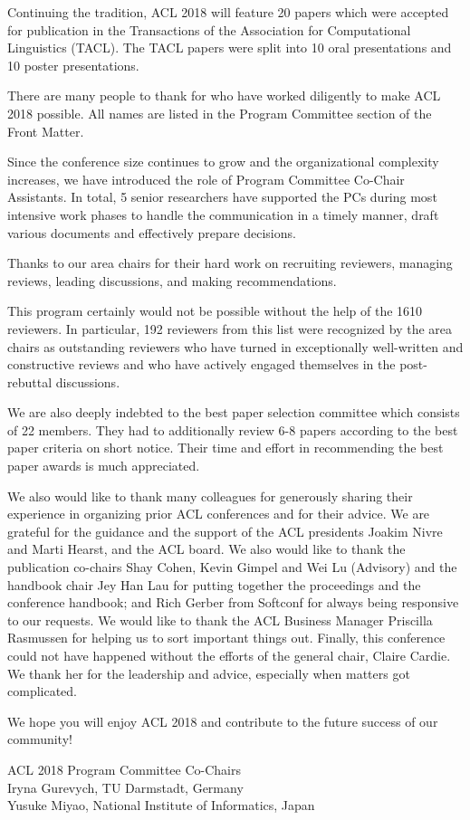 Continuing the tradition, ACL 2018 will feature 20 papers
which were accepted for publication in the Transactions of the
Association for Computational Linguistics (TACL). The TACL papers
were split into 10 oral presentations and 10 poster presentations.

There are many people to thank for who have worked diligently to
make ACL 2018 possible. All names are listed in the Program Committee section of the Front
Matter. 

Since the conference size continues to grow and the organizational complexity increases, we have introduced the role of Program Committee Co-Chair Assistants. In total, 5 senior researchers have supported the PCs during most intensive work phases to handle the communication in a timely manner, draft various documents and effectively prepare decisions.

Thanks to our area chairs for their hard work on recruiting reviewers, managing reviews,
leading discussions, and making recommendations.  

This program certainly would not be possible without the help of
the 1610 reviewers.
In particular, 192 reviewers from this list were recognized
by the area chairs as outstanding reviewers who have turned in exceptionally
well-written and constructive reviews and who have actively engaged themselves in
the post-rebuttal discussions. 

We are also deeply indebted to the best paper selection committee which consists
of 22 members. They had to additionally review 6-8 papers according to the best paper criteria on short notice. Their time and effort in recommending the best paper awards is much appreciated.

We also would like to thank many colleagues for generously sharing their experience in
organizing prior ACL conferences and for their advice. We are
grateful for the guidance and the support of the ACL presidents
Joakim Nivre and Marti Hearst, and the ACL board. We also would like to thank
the publication co-chairs Shay Cohen, Kevin Gimpel and Wei Lu (Advisory) and the handbook chair Jey Han Lau for putting
together the proceedings and the conference handbook; and Rich Gerber from Softconf for always being responsive to our
requests. We would like to thank the ACL Business Manager Priscilla Rasmussen for helping us to sort important things out. 
Finally, this conference could not have happened without the efforts
of the general chair, Claire Cardie. We thank her for the leadership and advice, especially when matters got complicated.

We hope you will enjoy ACL 2018 and contribute to the future success of our community!


\vspace{1.0em}

\noindent ACL 2018 Program Committee Co-Chairs \\
Iryna Gurevych, TU Darmstadt, Germany \\
Yusuke Miyao, National Institute of Informatics, Japan
